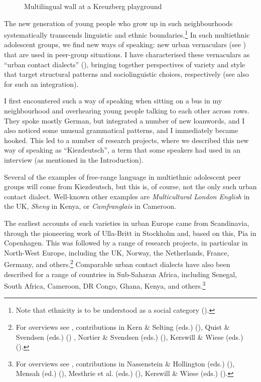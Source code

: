 \begin{figure}[H]
\caption{\label{fig:10} Multilingual wall at a Kreuzberg playground}
\end{figure}

The new generation of young people who grow up in such neighbourhoods systematically transcends linguistic and ethnic boundaries.\footnote{Note that ethnicity is to be understood as a social category (\citealt{Wiese2022}).} In such multiethnic adolescent groups, we find new ways of speaking: new urban vernaculars (see \citealt{Rampton2010}) that are used in peer-group situations. I have characterised these vernaculars as “urban contact dialects” (\cite{Wiese2013,Wiese2022}), bringing together perspectives of variety and style that target structural patterns and sociolinguistic choices, respectively (see also \citealt{Quist2008} for such an integration).

I first encountered such a way of speaking when sitting on a bus in my neighbourhood and overhearing young people talking to each other across rows. They spoke mostly German, but integrated a number of new loanwords, and I also noticed some unusual grammatical patterns, and I immediately became hooked. This led to a number of research projects, where we described this new way of speaking as “Kiezdeutsch”, a term that some speakers had used in an interview (as mentioned in the Introduction).

Several of the examples of free-range language in multiethnic adolescent peer groups will come from Kiezdeutsch, but this is, of course, not the only such urban contact dialect. Well-known other examples are \textit{Multicultural London English} in the UK, \textit{Sheng} in Kenya, or \textit{Camfranglais} in Cameroon.

The earliest accounts of such varieties in urban Europe came from Scandinavia, through the pioneering work of Ulla-Britt \citet{Kotsinas1988} in Stockholm and, based on this, Pia \citet{Quist2000} in Copenhagen. This was followed by a range of research projects, in particular in North-West Europe, including the UK, Norway, the Netherlands, France, Germany, and others.\footnote{For overviews see \citet{CheshireEtal2015}, contributions in Kern \& Selting (eds.) (\citeyear{KernSelting2011}), Quist \& Svendsen (eds.) (\citeyear{QuistSvendsen2010}) , Nortier \& Svendsen (eds.) (\citeyear{NortierSvendsen2015}),
Kerswill \& Wiese (eds.) (\citeyear{KerswillWieseEds2022}).} Comparable urban contact dialects have also been described for a range of countries in Sub-Saharan Africa, including Senegal, South Africa, Cameroon, DR Congo, Ghana, Kenya, and others.\footnote{For overviews see \citet{KießlingMous2004}, contributions in Nassenstein \& Hollington (eds.) (\citeyear{NassensteinHollington2015}), Mensah (ed.) (\citeyear{Mensah2016}), Mesthrie et al. (eds.) (\citeyear{MesthrieEtal2021}), Kerswill \& Wiese (eds.) (\citeyear{KerswillWieseEds2022}).}

